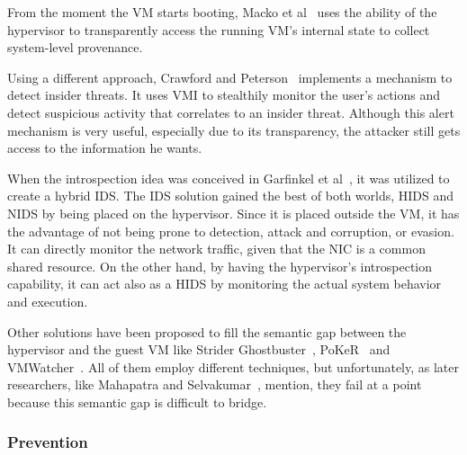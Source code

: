 \par From the moment the \ac{VM} starts booting, Macko et al~\cite{macko2011collecting} uses the ability of the hypervisor to transparently access the running \ac{VM}’s internal state to collect system-level provenance. 

\par Using a different approach, Crawford and Peterson~\cite{crawford2013insider} implements a mechanism to detect insider threats. It uses \ac{VMI} to stealthily monitor the user’s actions and detect suspicious activity that correlates to an insider threat. Although this alert mechanism is very useful, especially due to its transparency, the attacker still gets access to the information he wants.

\par When the introspection idea was conceived in Garfinkel et al~\cite{garfinkel2003virtual}, it was utilized to create a hybrid \ac{IDS}. The \ac{IDS} solution gained the best of both worlds, \ac{HIDS} and \ac{NIDS} by being placed on the hypervisor. Since it is placed outside the \ac{VM}, it has the advantage of not being prone to detection, attack and corruption, or evasion. It can directly monitor the network traffic, given that the \ac{NIC} is a common shared resource. On the other hand, by having the hypervisor’s introspection capability, it can act also as a \ac{HIDS} by monitoring the actual system behavior and execution. 

\par Other solutions have been proposed to fill the semantic gap between the hypervisor and the guest \ac{VM} like Strider Ghostbuster~\cite{wang2005detecting}, PoKeR~\cite{riley2009multi} and VMWatcher~\cite{jiang2007stealthy}. All of them employ different techniques, but unfortunately, as later researchers, like Mahapatra and Selvakumar~\cite{mahapatra2011online}, mention, they fail at a point because this semantic gap is difficult to bridge. 

\subsubsection{Prevention}

